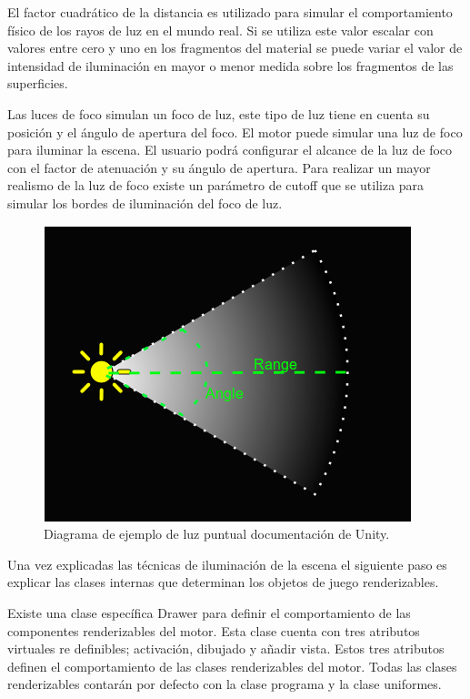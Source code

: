 \documentclass[a4paper, 17pt]{book}
\begin{document}
\vspace{1mm} %

El factor cuadrático de la distancia es utilizado para simular el comportamiento físico de los rayos de luz
en el mundo real. Si se utiliza este valor escalar con valores entre cero y uno en los fragmentos del material
se puede variar el valor de intensidad de iluminación en mayor o menor medida sobre los fragmentos de las superficies.

\vspace{1mm} %

Las luces de foco simulan un foco de luz, este tipo de luz tiene en cuenta su posición y el ángulo de apertura
del foco. El motor puede simular una luz de foco para iluminar la escena. El usuario podrá configurar el alcance
de la luz de foco con el factor de atenuación y su ángulo de apertura. Para realizar un mayor realismo de la
luz de foco existe un parámetro de cutoff que se utiliza para simular los bordes de iluminación del foco de luz.

\begin{figure}[H]
    \centering
    \includegraphics[scale=0.5, keepaspectratio]{img/SpotLightDiagram.png}
    \caption{Diagrama de ejemplo de luz puntual documentación de Unity.}
    \label{figura:SpotLightDiagram}
\end{figure}

Una vez explicadas las técnicas de iluminación de la escena el siguiente paso es explicar las clases internas
que determinan los objetos de juego renderizables.

\vspace{1mm} %

Existe una clase específica Drawer para definir el comportamiento de las componentes renderizables del motor.
Esta clase cuenta con tres atributos virtuales re definibles; activación, dibujado y añadir vista. Estos tres
atributos definen el comportamiento de las clases renderizables del motor. Todas las clases renderizables contarán
por defecto con la clase programa y la clase uniformes.
\end{document}
